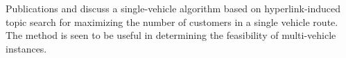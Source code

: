\documentclass[dissertation,draft*]{aaltoseries}
\begin{document}
Publications  and  discuss a single-vehicle algorithm based on hyperlink-induced topic search \cite{kleinberg} 
for maximizing the number of customers in a single vehicle route. The method is seen to
be useful in determining the feasibility of multi-vehicle instances. 

% 
% 
% 
\end{document}
